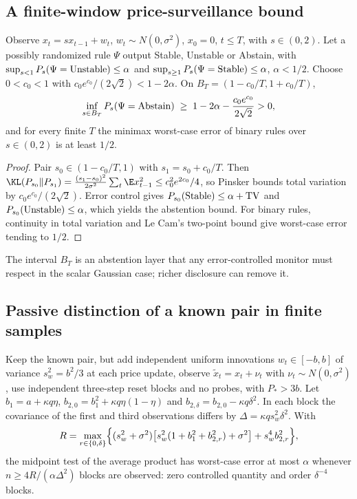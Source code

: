 \subsection{A finite-window price-surveillance bound}

\begin{theorem}\label{p1:thm:abstain}
Observe $x_t=sx_{t-1}+w_t$, $w_t\sim N(0,\sigma^2)$, $x_0=0$, $t\le T$, with $s\in(0,2)$. Let a possibly randomized rule $\Psi$ output Stable, Unstable or Abstain, with $\sup_{s<1}P_s(\Psi={\rm Unstable})\le\alpha$ and $\sup_{s\ge1}P_s(\Psi={\rm Stable})\le\alpha$, $\alpha<1/2$. Choose $0<c_0<1$ with $c_0e^{c_0}/(2\sqrt2)<1-2\alpha$. On $B_T=(1-c_0/T,1+c_0/T)$,
\[
\inf_{s\in B_T}P_s(\Psi={\rm Abstain})\;\ge\;1-2\alpha-\frac{c_0e^{c_0}}{2\sqrt2}>0 ,
\]
and for every finite $T$ the minimax worst-case error of binary rules over $s\in(0,2)$ is at least $1/2$.
\end{theorem}

\begin{proof}
Pair $s_0\in(1-c_0/T,1)$ with $s_1=s_0+c_0/T$. Then $\KL(P_{s_0}\|P_{s_1})=\frac{(s_1-s_0)^2}{2\sigma^2}\sum_t\E x_{t-1}^2\le c_0^2e^{2c_0}/4$, so Pinsker bounds total variation by $c_0e^{c_0}/(2\sqrt2)$. Error control gives $P_{s_0}({\rm Stable})\le\alpha+{\rm TV}$ and $P_{s_0}({\rm Unstable})\le\alpha$, which yields the abstention bound. For binary rules, continuity in total variation and Le Cam's two-point bound give worst-case error tending to $1/2$.
\end{proof}

The interval $B_T$ is an abstention layer that any error-controlled monitor must respect in the scalar Gaussian case; richer disclosure can remove it.

\subsection{Passive distinction of a known pair in finite samples}

\begin{proposition}\label{p1:prop:passive0}
Keep the known pair, but add independent uniform innovations $w_t\in[-b,b]$ of variance $s_w^2=b^2/3$ at each price update, observe $\tilde x_t=x_t+\nu_t$ with $\nu_t\sim N(0,\sigma^2)$, use independent three-step reset blocks and no probes, with $P_*>3b$. Let $b_1=a+\kappa q\eta$, $b_{2,0}=b_1^2+\kappa q\eta(1-\eta)$ and $b_{2,\delta}=b_{2,0}-\kappa q\delta^2$. In each block the covariance of the first and third observations differs by $\Delta=\kappa qs_w^2\delta^2$. With
\[
R=\max_{r\in\{0,\delta\}}\Bigl\{(s_w^2+\sigma^2)\bigl[s_w^2(1+b_1^2+b_{2,r}^2)+\sigma^2\bigr]+s_w^4b_{2,r}^2\Bigr\},
\]
the midpoint test of the average product has worst-case error at most $\alpha$ whenever $n\ge4R/(\alpha\Delta^2)$ blocks are observed: zero controlled quantity and order $\delta^{-4}$ blocks.
\end{proposition}

